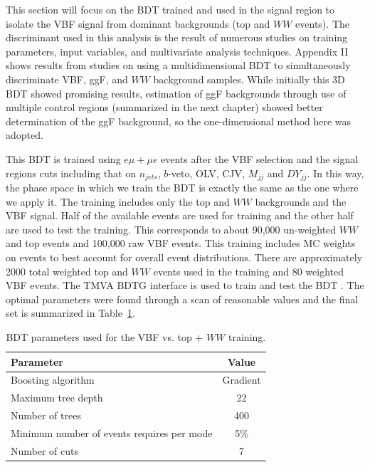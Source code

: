 This section will focus on the BDT trained and used in the signal region to isolate the VBF signal from dominant backgrounds (top and $WW$ events). The discriminant used in this analysis is the result of numerous studies on training parameters, input variables, and multivariate analysis techniques. Appendix II shows results from studies on using a multidimensional BDT to simultaneously discriminate VBF, ggF, and $WW$ background samples. While initially this 3D BDT showed promising results, estimation of ggF backgrounds through use of multiple control regions (summarized in the next chapter) showed better determination of the ggF background, so the one-dimensional method here was adopted. 

This BDT is trained using $e\mu+\mu e$ events after the VBF selection and the signal regions cuts including that on $n_{jets}$, $b$-veto, OLV, CJV, $M_{jj}$ and $DY_{jj}$. In this way, the phase space in which we train the BDT is exactly the same as the one where we apply it. The training includes only the top and $WW$ backgrounds and the VBF signal. Half of the available events are used for training and the other half are used to test the training. This corresponds to about 90,000 un-weighted $WW$ and top events and 100,000 raw VBF events. This training includes MC weights on events to best account for overall event distributions. There are approximately 2000 total weighted top and $WW$ events used in the training and 80 weighted VBF events. 
The TMVA BDTG interface is used to train and test the BDT \cite{TMVA}. The optimal parameters were found through a scan of reasonable values and the final set is summarized in Table~\ref{tab:SRBDTparameters}.
\begin{table}[h!]
\centering
\begin{tabular}{|l|c|}
\hline
Parameter                                    & Value     \\
\hline
Boosting algorithm                           &  Gradient  \\
Maximum tree depth                           &  22       \\
Number of trees                              &  400     \\
Minimum number of events requires per mode   &  5\%      \\
Number of cuts                               &  7        \\
\hline
\end{tabular}
\caption{BDT parameters used for the VBF vs. top + $WW$ training.} 
\label{tab:SRBDTparameters}
\end{table}
